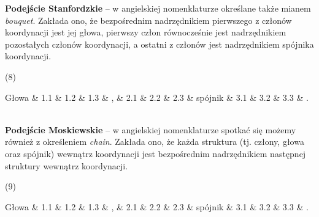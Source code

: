 \documentclass[licencjacka]{pracamgr_Kogni}
\begin{document}
\textbf{Podejście Stanfordzkie} -- w angielskiej nomenklaturze określane także mianem \textit{bouquet}. Zakłada ono, że bezpośrednim nadrzędnikiem pierwszego z członów koordynacji jest jej głowa, pierwszy człon równocześnie jest nadrzędnikiem pozostałych członów koordynacji, a ostatni z członów jest nadrzędnikiem spójnika koordynacji.

(8)

\begin{dependency}[theme = simple, group style = outer bubble]
    \centering
    \begin{deptext}[column sep=0.5cm]
       Głowa \& 1.1 \& 1.2 \& 1.3 \& , \& 2.1 \& 2.2 \& 2.3 \& spójnik \& 3.1 \& 3.2 \& 3.3 \& . \\
    \end{deptext}
\end{dependency}
\\

\textbf{Podejście Moskiewskie} -- w angielskiej nomenklaturze spotkać się możemy również z określeniem \textit{chain}. Zakłada ono, że każda struktura (tj. człony, głowa oraz spójnik) wewnątrz koordynacji jest bezpośrednim nadrzędnikiem następnej struktury wewnątrz koordynacji.

(9)

\begin{dependency}[theme = simple, group style = outer bubble]
    \centering
    \begin{deptext}[column sep=0.5cm]
       Głowa \& 1.1 \& 1.2 \& 1.3 \& , \& 2.1 \& 2.2 \& 2.3 \& spójnik \& 3.1 \& 3.2 \& 3.3 \& . \\
    \end{deptext}
\end{dependency}
\\
\end{document}
